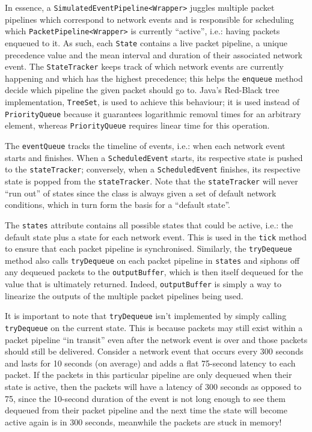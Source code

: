 In essence, a \texttt{SimulatedEventPipeline<Wrapper>} juggles multiple packet pipelines which correspond to network
events and is responsible for scheduling which \texttt{PacketPipeline<Wrapper>} is currently ``active'', i.e.:
having packets enqueued to it. As such, each \texttt{State} contains a live packet pipeline, a unique precedence
value and the mean interval and duration of their associated network event. The \texttt{StateTracker} keeps
track of which network events are currently happening and which has the highest precedence; this helps the
\texttt{enqueue} method decide which pipeline the given packet should go to. Java's Red-Black tree implementation,
\texttt{TreeSet}\cite{java_TreeSet, baeldung_java_TreeSet}, is used to achieve this behaviour; it is used instead of
\texttt{PriorityQueue} because it guarantees logarithmic removal times for an arbitrary element, whereas
\texttt{PriorityQueue} requires linear time for this operation\cite{java_PriorityQueue}.

The \texttt{eventQueue} tracks the timeline of events, i.e.: when each network event starts and finishes. When a
\texttt{ScheduledEvent} starts, its respective state is pushed to the \texttt{stateTracker}; conversely, when a
\texttt{ScheduledEvent} finishes, its respective state is popped from the \texttt{stateTracker}. Note that the
\texttt{stateTracker} will never ``run out'' of states since the class is always given a set of default network
conditions, which in turn form the basis for a ``default state''.

The \texttt{states} attribute contains all possible states that could be active, i.e.: the default state plus a state
for each network event. This is used in the \texttt{tick} method to ensure that each packet pipeline is synchronised.
Similarly, the \texttt{tryDequeue} method also calls \texttt{tryDequeue} on each packet pipeline in \texttt{states}
and siphons off any dequeued packets to the \texttt{outputBuffer}, which is then itself dequeued for the value
that is ultimately returned. Indeed, \texttt{outputBuffer} is simply a way to linearize the outputs of the multiple
packet pipelines being used.

It is important to note that \texttt{tryDequeue} isn't implemented by simply calling \texttt{tryDequeue} on the current
state. This is because packets may still exist within a packet pipeline ``in transit'' even after the network event is
over and those packets should still be delivered. Consider a network event that occurs every 300 seconds and lasts
for 10 seconds (on average) and adds a flat 75-second latency to each packet. If the packets in this particular
pipeline are only dequeued when their state is active, then the packets will have a latency of 300 seconds as opposed
to 75, since the 10-second duration of the event is not long enough to see them dequeued from their packet pipeline
and the next time the state will become active again is in 300 seconds, meanwhile the packets are stuck in memory!

